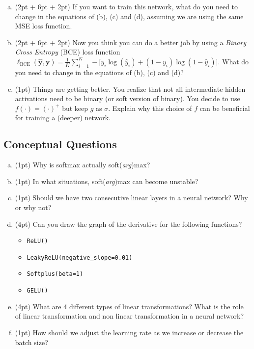 \begin{enumerate}[(a)] 
\item
(2pt + 6pt + 2pt) If you want to train this network, what do you need to change in the equations of (b), (c) and (d), assuming we are using the same MSE loss function.

\item
(2pt + 6pt + 2pt) Now you think you can do a better job by using a \emph{Binary Cross Entropy} (BCE) loss function $\ell_\text{BCE}(\bm{\hat{y}}, \bm{y}) = \frac{1}{K}\sum_{i=1}^K -\big[y_i \log(\hat{y}_i) + (1 - y_i)\log(1 - \hat{y}_i)\big]$.
What do you need to change in the equations of (b), (c) and (d)?

\item
(1pt) Things are getting better.
You realize that not all intermediate hidden activations need to be binary (or soft version of binary).
You decide to use $f(\cdot) = (\cdot)^+$ but keep $g$ as $\sigma$. Explain why this choice of $f$ can be beneficial for training a (deeper) network.


\end{enumerate}

\subsection{Conceptual Questions}

\begin{enumerate}[(a)]
    \item (1pt) Why is softmax actually soft(\textit{arg})max?
    \item (1pt) In what situations, soft(\textit{arg})max can become unstable?
    \item (1pt) Should we have two consecutive linear layers in a neural network? Why or why not? 
    
    \item (4pt) Can you draw the graph of the derivative for the following functions?
    \begin{itemize}
        \item \texttt{ReLU()}
        \item \texttt{LeakyReLU(negative\_slope=0.01)}
        \item \texttt{Softplus(beta=1)}
        \item \texttt{GELU()}
    \end{itemize}
    
    \item (4pt) What are 4 different types of linear transformations? What is the role of linear transformation and non linear transformation in a neural network?
    \item (1pt) How should we adjust the learning rate as we increase or decrease the batch size?
    
    
\end{enumerate}


